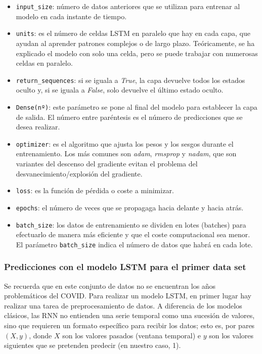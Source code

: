 \documentclass[12pt,twoside]{article}
\begin{document}
\begin{itemize}
    \item \texttt{input\_size}: número de datos anteriores que se utilizan para entrenar al modelo en cada instante de tiempo.
    \item \texttt{units}: es el número de celdas LSTM en paralelo que hay en cada capa, que ayudan al aprender patrones complejos o de largo plazo. Teóricamente, se ha explicado el modelo con solo una celda, pero se puede trabajar con numerosas celdas en paralelo.
    \item \texttt{return\_sequences}: si se iguala a \textit{True}, la capa devuelve todos los estados oculto y, si se iguala a \textit{False}, solo devuelve el último estado oculto.
    \item \texttt{Dense(nº)}: este parámetro se pone al final del modelo para establecer la capa de salida. El número entre paréntesis es el número de predicciones que se desea realizar.
    \item \texttt{optimizer}: es el algoritmo que ajusta los pesos y los sesgos durante el entrenamiento. Los más comunes son \textit{adam}, \textit{rmsprop} y \textit{nadam}, que son variantes del descenso del gradiente evitan el problema del desvanecimiento/explosión del gradiente.
    \item \texttt{loss}: es la función de pérdida o coste a minimizar.
    \item \texttt{epochs}: el número de veces que se propagaga hacia delante y hacia atrás.
    \item \texttt{batch\_size}: los datos de entrenamiento se dividen en lotes (batches) para efectuarlo de manera más eficiente y que el coste computacional sea menor. El parámetro \texttt{batch\_size} indica el número de datos que habrá en cada lote.
\end{itemize}

\subsubsection{Predicciones con el modelo LSTM para el primer data set}\label{sec:19}

Se recuerda que en este conjunto de datos no se encuentran los años problemáticos del COVID. Para realizar un modelo LSTM, en primer lugar hay realizar una tarea de preprocesamiento de datos. A diferencia de los modelos clásicos, las RNN no entienden una serie temporal como una sucesión de valores, sino que requieren un formato específico para recibir los datos; esto es, por pares $(X,y)$, donde $X$ son los valores pasados (ventana temporal) e $y$ son los valores siguientes que se pretenden predecir (en nuestro caso, 1).
\end{document}
